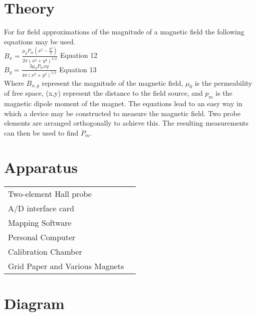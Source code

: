 \documentclass{article}
\begin{document}
\section{Theory}
For far field approximations of the magnitude of a magnetic field the following equations may be used.\\

$B_x=\frac{\mu_0P_m(x^2-\frac{y^2}{2})}{2\pi(x^2+y^2)^{5/2}}$ Equation 12\\


$B_y=\frac{3\mu_0P_mxy}{4\pi(x^2+y^2)^{5/2}}$ Equation 13\\

Where $B_{x,y}$ represent the magnitude of the magnetic field, $\mu_0$ is the permeability of free space, (x,y) represent the distance to the field source, and $p_m$ is the magnetic dipole moment of the magnet. The equations lead to an easy way in which a device may be constructed to measure the magnetic field. Two probe elements are arranged orthogonally to achieve this. The resulting measurements can then be used to find $P_m$.
\section{Apparatus}
\begin{tabular}{ll}
Two-element Hall probe\\
A/D interface card\\
Mapping Software\\
Personal Computer\\
Calibration Chamber\\
Grid Paper and Various Magnets\\
\end{tabular}

\section{Diagram}

\ 

\ 

\ 

\ 

\ 

\ 

\ 

\ 

\ 

\

\

\ 

\ 
\end{document}
